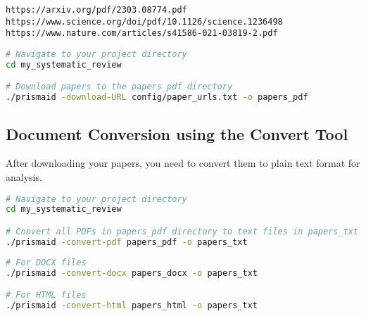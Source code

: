 \begin{infobox}
\begin{lstlisting}
https://arxiv.org/pdf/2303.08774.pdf
https://www.science.org/doi/pdf/10.1126/science.1236498
https://www.nature.com/articles/s41586-021-03819-2.pdf
\end{lstlisting}
\end{infobox}

\begin{commandbox}
\begin{lstlisting}[language=Bash]
# Navigate to your project directory
cd my_systematic_review

# Download papers to the papers_pdf directory
./prismaid -download-URL config/paper_urls.txt -o papers_pdf
\end{lstlisting}
\end{commandbox}



\subsection{Document Conversion using the Convert Tool}

After downloading your papers, you need to convert them to plain text format for analysis.

\begin{commandbox}
\begin{lstlisting}[language=Bash]
# Navigate to your project directory
cd my_systematic_review

# Convert all PDFs in papers_pdf directory to text files in papers_txt
./prismaid -convert-pdf papers_pdf -o papers_txt
\end{lstlisting}
\end{commandbox}

\begin{commandbox}
\begin{lstlisting}[language=Bash]
# For DOCX files
./prismaid -convert-docx papers_docx -o papers_txt

# For HTML files
./prismaid -convert-html papers_html -o papers_txt
\end{lstlisting}
\end{commandbox}


